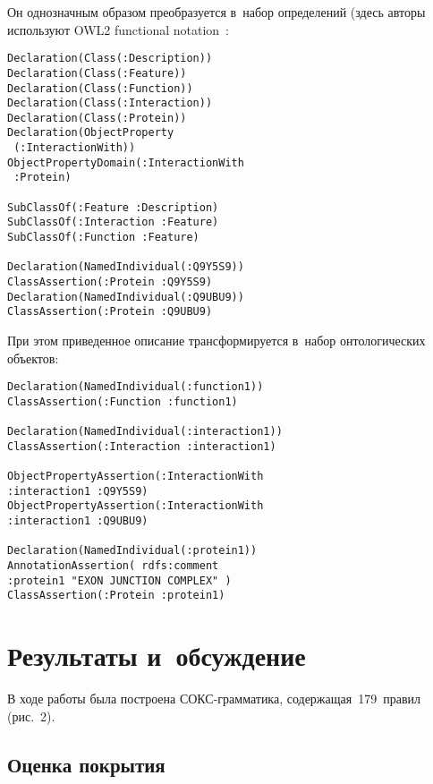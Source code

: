 \begin{multicols}{2}
        
  Он однозначным образом преобразуется в~набор определений (здесь авторы 
используют OWL2 functional notation~\cite{18-al}:
  \begin{verbatim}
Declaration(Class(:Description))
Declaration(Class(:Feature))
Declaration(Class(:Function))
Declaration(Class(:Interaction))
Declaration(Class(:Protein))
Declaration(ObjectProperty
 (:InteractionWith))
ObjectPropertyDomain(:InteractionWith 
 :Protein)
        
SubClassOf(:Feature :Description)
SubClassOf(:Interaction :Feature)
SubClassOf(:Function :Feature)
      
Declaration(NamedIndividual(:Q9Y5S9))
ClassAssertion(:Protein :Q9Y5S9)
Declaration(NamedIndividual(:Q9UBU9))
ClassAssertion(:Protein :Q9UBU9)
\end{verbatim}
        
  При этом приведенное описание трансформируется в~набор онтологических 
объектов:
  \begin{verbatim}
Declaration(NamedIndividual(:function1))
ClassAssertion(:Function :function1)

Declaration(NamedIndividual(:interaction1))
ClassAssertion(:Interaction :interaction1)

ObjectPropertyAssertion(:InteractionWith 
:interaction1 :Q9Y5S9)
ObjectPropertyAssertion(:InteractionWith 
:interaction1 :Q9UBU9)

Declaration(NamedIndividual(:protein1))
AnnotationAssertion( rdfs:comment 
:protein1 "EXON JUNCTION COMPLEX" )
ClassAssertion(:Protein :protein1)
\end{verbatim}

\vspace*{-16pt}

\section{Результаты и~обсуждение}
  

  
  В ходе работы была построена СОКС-грам\-ма\-ти\-ка, 
содержащая~179~правил (рис.~2).

\vspace*{-8pt}
  
  \subsection{Оценка покрытия}
  

\end{multicols}
